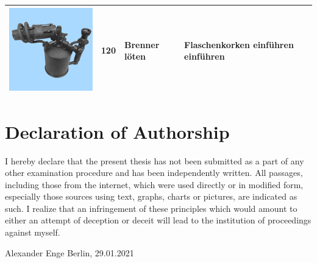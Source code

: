 \documentclass[
  english,
  doc,12pt,twoside,floatsintext]{apa7}
\begin{document}
\begin{center}
\begin{ThreePartTable}
\begin{longtable}{llll}
\includegraphics[valign=c, scale=0.19]{../materials/unfamiliar/120.png} & 120 & Brenner löten & Flaschenkorken einführen einführen\\
\bottomrule
\end{longtable}

\end{ThreePartTable}
\end{center}

\newpage
\setlength{\parindent}{0.5in}

\hypertarget{declaration-of-authorship}{%
\section*{Declaration of Authorship}\label{declaration-of-authorship}}

I hereby declare that the present thesis has not been submitted as a part of any other examination procedure and has been independently written. All passages, including those from the internet, which were used directly or in modified form, especially those sources using text, graphs, charts or pictures, are indicated as such. I realize that an infringement of these principles which would amount to either an attempt of deception or deceit will lead to the institution of proceedings against myself.

\vspace*{20mm}

\noindent
Alexander Enge\newline
Berlin, 29.01.2021

\clearpage

\mbox{}\thispagestyle{empty}\clearpage
\end{document}
